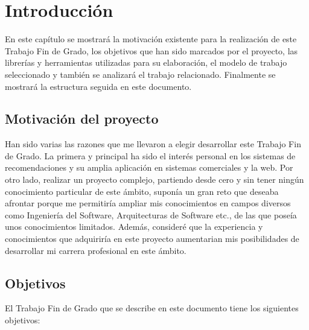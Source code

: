\chapter{Introducción}
\thispagestyle{empty}

En este capítulo se mostrará la motivación existente para la realización de este Trabajo Fin de Grado, los objetivos que han sido marcados por el proyecto, las librerías y herramientas utilizadas para su elaboración, el modelo de trabajo seleccionado y también se analizará el trabajo relacionado. Finalmente se mostrará la estructura seguida en este documento.

\section{Motivación del proyecto}
\thispagestyle{empty}


Han sido varias las razones que me llevaron a elegir desarrollar este Trabajo Fin de Grado. La primera y principal ha sido el interés personal en los sistemas de recomendaciones y su amplia aplicación en sistemas comerciales y la web. Por otro lado, realizar un proyecto complejo, partiendo desde cero y sin tener ningún conocimiento particular de este ámbito, suponía un gran reto que deseaba afrontar porque me permitiría ampliar mis conocimientos en campos diversos como Ingeniería del Software, Arquitecturas de Software etc., de las que poseía unos conocimientos limitados. Además, consideré que la experiencia y conocimientos que adquiriría en este proyecto aumentarian mis posibilidades de desarrollar mi carrera profesional en este ámbito.

\section{Objetivos}
\thispagestyle{empty}


El Trabajo Fin de Grado que se describe en este documento tiene los siguientes objetivos:

